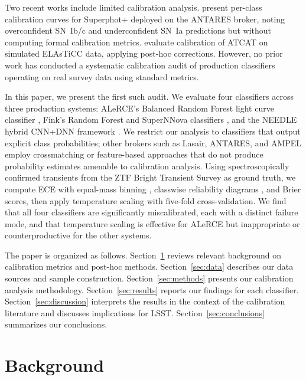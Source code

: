 \documentclass[twocolumn]{aastex631}
\begin{document}
Two recent works include limited calibration analysis. \citet{desoto2024} present per-class calibration curves for Superphot+ deployed on the ANTARES broker, noting overconfident SN~Ib/c and underconfident SN~Ia predictions but without computing formal calibration metrics. \citet{tung2025} evaluate calibration of ATCAT on simulated ELAsTiCC data, applying post-hoc corrections. However, no prior work has conducted a systematic calibration audit of production classifiers operating on real survey data using standard metrics.

In this paper, we present the first such audit. We evaluate four classifiers across three production systems: ALeRCE's Balanced Random Forest light curve classifier \citep[lc\_classifier v1.1.13;][]{sanchezsaez2021}, Fink's Random Forest and SuperNNova classifiers \citep{leoni2022, moller2020}, and the NEEDLE hybrid CNN+DNN framework \citep{sheng2024}. We restrict our analysis to classifiers that output explicit class probabilities; other brokers such as Lasair, ANTARES, and AMPEL employ crossmatching or feature-based approaches that do not produce probability estimates amenable to calibration analysis. Using spectroscopically confirmed transients from the ZTF Bright Transient Survey \citep[BTS;][]{fremling2020, perley2020} as ground truth, we compute ECE with equal-mass binning \citep{roelofs2022}, classwise reliability diagrams \citep{nixon2019}, and Brier scores, then apply temperature scaling with five-fold cross-validation. We find that all four classifiers are significantly miscalibrated, each with a distinct failure mode, and that temperature scaling is effective for ALeRCE but inappropriate or counterproductive for the other systems.

The paper is organized as follows. Section~\ref{sec:background} reviews relevant background on calibration metrics and post-hoc methods. Section~\ref{sec:data} describes our data sources and sample construction. Section~\ref{sec:methods} presents our calibration analysis methodology. Section~\ref{sec:results} reports our findings for each classifier. Section~\ref{sec:discussion} interprets the results in the context of the calibration literature and discusses implications for LSST. Section~\ref{sec:conclusions} summarizes our conclusions.


\section{Background} \label{sec:background}
\end{document}
